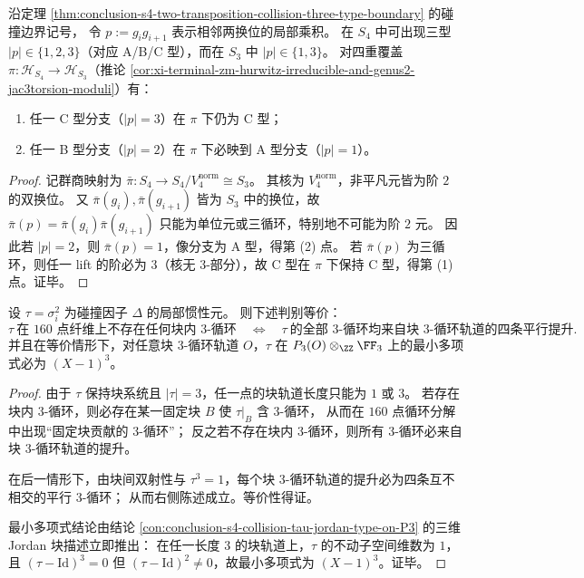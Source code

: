 \begin{conclusion}\label{con:conclusion-s4-to-s3-btype-only-over-atype}
沿定理 \ref{thm:conclusion-s4-two-transposition-collision-three-type-boundary} 的碰撞边界记号，
令 \(p:=g_ig_{i+1}\) 表示相邻两换位的局部乘积。
在 \(S_4\) 中可出现三型 \(|p|\in\{1,2,3\}\)（对应 A/B/C 型），而在 \(S_3\) 中 \(|p|\in\{1,3\}\)。
对四重覆盖 \(\pi:\mathcal H_{S_4}\to\mathcal H_{S_3}\)（推论 \ref{cor:xi-terminal-zm-hurwitz-irreducible-and-genus2-jac3torsion-moduli}）有：
\begin{enumerate}
  \item 任一 C 型分支（\(|p|=3\)）在 \(\pi\) 下仍为 C 型；
  \item 任一 B 型分支（\(|p|=2\)）在 \(\pi\) 下必映到 A 型分支（\(|p|=1\)）。
\end{enumerate}
\end{conclusion}
\begin{proof}
记群商映射为
\(
\bar\pi:S_4\to S_4/V_4^{\mathrm{norm}}\cong S_3
\)。
其核为 \(V_4^{\mathrm{norm}}\)，非平凡元皆为阶 \(2\) 的双换位。
又 \(\bar\pi(g_i),\bar\pi(g_{i+1})\) 皆为 \(S_3\) 中的换位，故
\(\bar\pi(p)=\bar\pi(g_i)\bar\pi(g_{i+1})\) 只能为单位元或三循环，特别地不可能为阶 \(2\) 元。
因此若 \(|p|=2\)，则 \(\bar\pi(p)=1\)，像分支为 A 型，得第 (2) 点。
若 \(\bar\pi(p)\) 为三循环，则任一 lift 的阶必为 \(3\)（核无 \(3\)-部分），故 C 型在 \(\pi\) 下保持 C 型，得第 (1) 点。证毕。
\end{proof}

\begin{conclusion}\label{con:conclusion-s4-collision-no-internal-twist-uplift-criterion}
设 \(\tau=\sigma_i^2\) 为碰撞因子 \(\Delta\) 的局部惯性元。
则下述判别等价：
\[
\tau\ \text{在 \(160\) 点纤维上不存在任何块内 \(3\)-循环}
\quad\Longleftrightarrow\quad
\tau\ \text{的全部 \(3\)-循环均来自块 \(3\)-循环轨道的四条平行提升}.
\]
并且在等价情形下，对任意块 \(3\)-循环轨道 \(O\)，\(\tau\) 在
\(
P_3(O)\otimes_{\ZZ}\FF_3
\)
上的最小多项式必为 \((X-1)^3\)。
\end{conclusion}
\begin{proof}
由于 \(\tau\) 保持块系统且 \(|\tau|=3\)，任一点的块轨道长度只能为 \(1\) 或 \(3\)。
若存在块内 \(3\)-循环，则必存在某一固定块 \(B\) 使 \(\tau|_B\) 含 \(3\)-循环，
从而在 \(160\) 点循环分解中出现“固定块贡献的 \(3\)-循环”；
反之若不存在块内 \(3\)-循环，则所有 \(3\)-循环必来自块 \(3\)-循环轨道的提升。
\par
在后一情形下，由块间双射性与 \(\tau^3=1\)，每个块 \(3\)-循环轨道的提升必为四条互不相交的平行 \(3\)-循环；
从而右侧陈述成立。等价性得证。
\par
最小多项式结论由结论 \ref{con:conclusion-s4-collision-tau-jordan-type-on-P3} 的三维 Jordan 块描述立即推出：
在任一长度 \(3\) 的块轨道上，\(\tau\) 的不动子空间维数为 \(1\)，且 \((\tau-\mathrm{Id})^3=0\) 但 \((\tau-\mathrm{Id})^2\neq 0\)，故最小多项式为 \((X-1)^3\)。证毕。
\end{proof}


